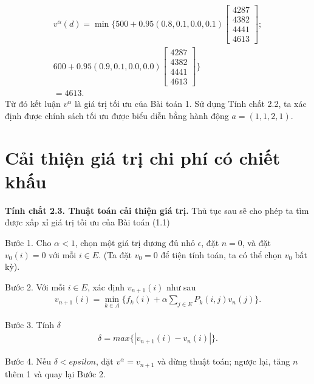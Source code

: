 \documentclass[12pt,a4paper]{report}
\begin{document}
    \begin{align*}
    v^\alpha(d)=\min\{500+0.95(0.8,0.1,0.0,0.1)
    \left[
    \begin{array}{c}
    4287\\
    4382\\
    4441\\
    4613
    \end{array}
    \right];\\
    600+0.95(0.9,0.1,0.0,0.0)  
    \left[
    \begin{array}{c}
    4287\\
    4382\\
    4441\\
    4613
    \end{array}
    \right]\}\\
    =4613.
    \end{align*}
    Từ đó kết luận $v^\alpha$ là giá trị tối ưu của Bài toán 1. Sử dụng Tính chất 2.2, ta xác định được chính sách tối ưu được biểu diễn bằng hành động $a=(1,1,2,1)$.
    
    \section{Cải thiện giá trị chi phí có chiết khấu}
 
 \begin{shaded*}
 \noindent
 \textbf{Tính chất 2.3. {Thuật toán cải thiện giá trị}.}
 \selectfont 
 Thủ tục sau sẽ cho phép ta tìm được xấp xỉ giá trị tối ưu của Bài toán (1.1)
 
 \medskip
 \noindent
 Bước 1. Cho $\alpha <1$, chọn một giá trị dương đủ nhỏ $\epsilon$, đặt $n=0$, và đặt $v_0(i)=0$ với mỗi $i \in E$. (Ta đặt $v_0 =0$ để tiện tính toán, ta có thể chọn $v_0$ bất kỳ).
 
 \medskip
 \noindent
 Bước 2. Với mỗi $i \in E$, xác định $v_{n+1}(i)$ như sau
 \begin{align*}
 v_{n+1}(i)=\underset{k \in A}{\min}\{f_k(i)+\alpha \sum_{j\in E} P_k(i,j)v_n(j)\}.
 \end{align*}
 
 \medskip
 \noindent
 Bước 3. Tính $\delta$
 \begin{align*}
 \delta=max\{|v_{n+1}(i)-v_{n}(i)|\}.
 \end{align*}
 
 \medskip
 \noindent
 Bước 4. Nếu $\delta<epsilon$, đặt $v^\alpha =v_{n+1}$ và dừng thuật toán; ngược lại, tăng $n$ thêm 1 và quay lại Bước 2.
 
 \end{shaded*}
   
\end{document}

